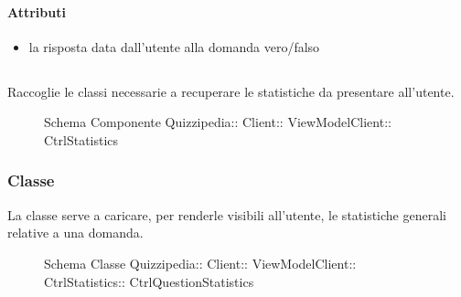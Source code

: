 \paragraph{Attributi}
\begin{itemize}
\item {}
\newline
la risposta data dall'utente alla domanda vero/falso
\end{itemize}
\subsection{}
Raccoglie le classi necessarie a recuperare le statistiche da presentare all'utente.
\begin{figure}[H]
\centering
\noindent{}
\caption[Schema Componente Quizzipedia::Client::ViewModelClient::CtrlStatistics]{Schema Componente Quizzipedia:: Client:: ViewModelClient:: CtrlStatistics}
\end{figure}
\subsubsection{Classe }
La classe serve a caricare, per renderle visibili all'utente, le statistiche generali relative a una domanda.
\begin{figure}[H]
\centering
\noindent{}
\caption[Schema Classe CtrlQuestionStatistics]{Schema Classe Quizzipedia:: Client:: ViewModelClient:: CtrlStatistics:: CtrlQuestionStatistics}
\end{figure}
